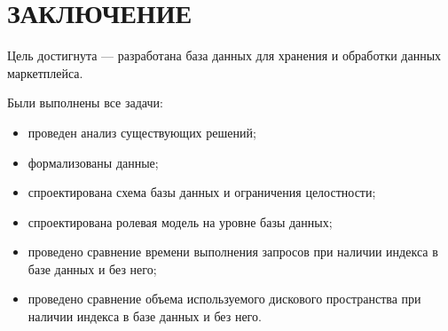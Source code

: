\chapter*{ЗАКЛЮЧЕНИЕ}

Цель достигнута --- разработана база данных для хранения и обработки данных маркетплейса.

Были выполнены все задачи:
\begin{itemize}
	\item[---] проведен анализ существующих решений;
	\item[---] формализованы данные;
	\item[---] спроектирована схема базы данных и ограничения целостности;
	\item[---] спроектирована ролевая модель на уровне базы данных;
    \item[---] проведено сравнение времени выполнения запросов при наличии индекса в базе данных и без него;
    \item[---] проведено сравнение объема используемого дискового пространства при наличии индекса в базе данных и без него.
\end{itemize}
